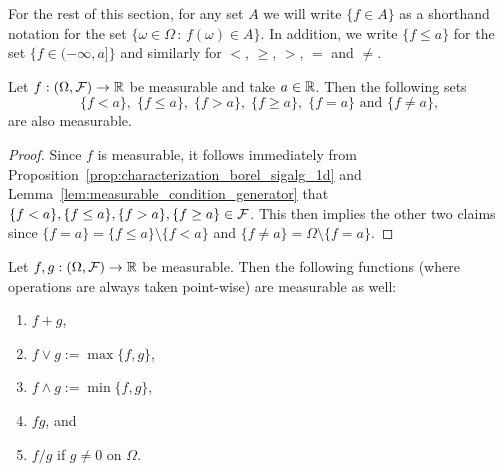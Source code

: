 For the rest of this section, for any set $A$ we will write $\{f \in A\}$ as a shorthand notation for the set $\{\omega \in \Omega \, :\, f(\omega) \in A\}$. In addition, we write $\{f \le a\}$ for the set $\{f \in (-\infty, a]\}$ and similarly for $<$, $\ge$, $>$, $=$ and $\ne$.

\begin{lemma}\label{lem:measurable_set_real_line}
Let $f : (\Omega, \mathcal F) \to \mathbb R$ be measurable and take $a \in \mathbb R$. Then the following sets 
\[
	\{f < a\},\; \{f \le a\},\; \{f > a\},\; \{f \ge a\},\; \{f = a\} \text{ and } \{f \ne a\},
\]
are also measurable.
\end{lemma}

\begin{proof}
Since $f$ is measurable, it follows immediately from Proposition~\ref{prop:characterization_borel_sigalg_1d} and Lemma~\ref{lem:measurable_condition_generator} that $\{f < a\}, \{f \le a\},\{f > a\}, \{f \ge a\} \in \mathcal F$. This then implies the other two claims since $\{f = a\} = \{f \le a\} \setminus \{f < a\}$ and $\{f \ne a\} = \Omega \setminus \{f = a\}$.
\end{proof}

\begin{lemma}\label{lem:basic_properties_measurable_functions}
Let $f, g : (\Omega, \mathcal F) \to \mathbb R$ be measurable. Then the following functions (where operations are always taken point-wise) are measurable as well:
\begin{enumerate}[label=(\arabic*)]
\item $f + g$,
\item $f \vee g := \max\{f,g\}$,
\item $f \wedge g := \min\{f,g\}$,
\item $f g$, and
\item $f/g$ if $g \ne 0$ on $\Omega$.
\end{enumerate} 
\end{lemma}

